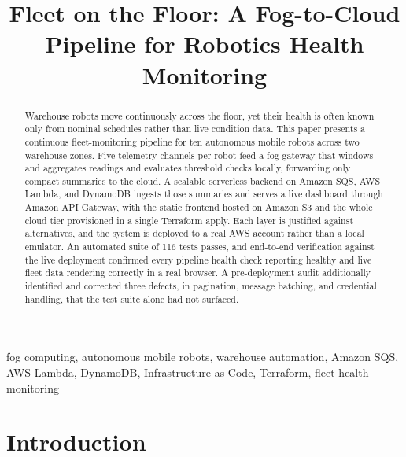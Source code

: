 \documentclass[conference]{IEEEtran}
\begin{document}
\title{Fleet on the Floor: A Fog-to-Cloud Pipeline for Robotics Health Monitoring}

\author{
}

\maketitle
{}

\begin{abstract}
Warehouse robots move continuously across the floor, yet their health is often known only from nominal schedules rather than live condition data. This paper presents a continuous fleet-monitoring pipeline for ten autonomous mobile robots across two warehouse zones. Five telemetry channels per robot feed a fog gateway that windows and aggregates readings and evaluates threshold checks locally, forwarding only compact summaries to the cloud. A scalable serverless backend on Amazon SQS, AWS Lambda, and DynamoDB ingests those summaries and serves a live dashboard through Amazon API Gateway, with the static frontend hosted on Amazon S3 and the whole cloud tier provisioned in a single Terraform apply. Each layer is justified against alternatives, and the system is deployed to a real AWS account rather than a local emulator. An automated suite of 116 tests passes, and end-to-end verification against the live deployment confirmed every pipeline health check reporting healthy and live fleet data rendering correctly in a real browser. A pre-deployment audit additionally identified and corrected three defects, in pagination, message batching, and credential handling, that the test suite alone had not surfaced.
\end{abstract}

\begin{IEEEkeywords}
fog computing, autonomous mobile robots, warehouse automation, Amazon SQS, AWS Lambda, DynamoDB, Infrastructure as Code, Terraform, fleet health monitoring
\end{IEEEkeywords}


\section{Introduction}
\end{document}
